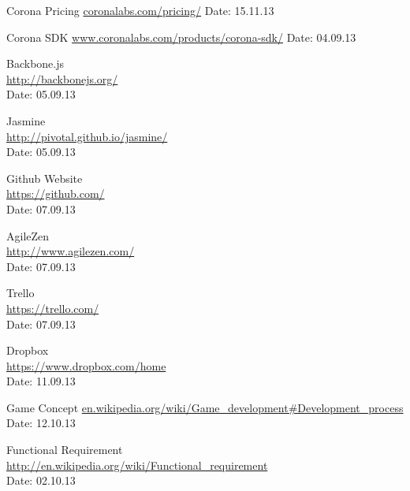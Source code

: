 \begin{thebibliography}{99}
	Corona Pricing\newline
	\href {http://coronalabs.com/pricing/}{coronalabs.com/pricing/}\newline
	Date: 15.11.13

	Corona SDK\newline
	\href {http://www.coronalabs.com/products/corona-sdk/}{www.coronalabs.com/products/corona-sdk/}\newline
	Date: 04.09.13

	Backbone.js \\
	\href{http://backbonejs.org/}{http://backbonejs.org/} \\
	Date: 05.09.13

	Jasmine \\ 
	\href{http://pivotal.github.io/jasmine/}{http://pivotal.github.io/jasmine/} \\
	Date: 05.09.13

	Github Website\\
	\href{https://github.com/}{https://github.com/} \\
	Date: 07.09.13

	AgileZen \\
	\href{http://www.agilezen.com/}{http://www.agilezen.com/} \\
	Date: 07.09.13

	Trello \\
	\href{https://trello.com/}{https://trello.com/} \\
	Date: 07.09.13

	Dropbox \\
	\href{https://www.dropbox.com/home}{https://www.dropbox.com/home} \\
	Date: 11.09.13


	Game Concept\newline
	\href {en.wikipedia.org/wiki/Game_development#Development_process}{en.wikipedia.org/wiki/Game\_development\#Development\_process}\newline
	Date: 12.10.13


	Functional Requirement \\
	\href{http://en.wikipedia.org/wiki/Functional_requirement}{http://en.wikipedia.org/wiki/Functional\_requirement} \\
	Date: 02.10.13


\end{thebibliography}
